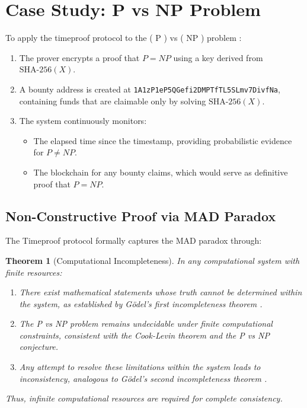 \documentclass[12pt]{report}
\newtheorem{theorem}{Theorem}
\begin{document}
\section{Case Study: P vs NP Problem}

To apply the timeproof protocol to the ( P ) vs ( NP ) problem \cite{Cook1971,Karp1972}:

\begin{enumerate}
    \item The prover encrypts a proof that \( P = NP \) using a key derived from \( \text{SHA-256}(X) \).
    \item A bounty address is created at \texttt{1A1zP1eP5QGefi2DMPTfTL5SLmv7DivfNa}, containing funds that are claimable only by solving \( \text{SHA-256}(X) \).
    \item The system continuously monitors:
    \begin{itemize}
        \item The elapsed time since the timestamp, providing probabilistic evidence for \( P \neq NP \).
        \item The blockchain for any bounty claims, which would serve as definitive proof that \( P = NP \).
    \end{itemize}
\end{enumerate}

\subsection{Non-Constructive Proof via MAD Paradox}
The Timeproof protocol formally captures the MAD paradox through:

\begin{theorem}[Computational Incompleteness]
In any computational system with finite resources:
\begin{enumerate}
    \item There exist mathematical statements whose truth cannot be determined within the system, as established by Gödel's first incompleteness theorem \cite{Godel1931}.
    \item The P vs NP problem remains undecidable under finite computational constraints, consistent with the Cook-Levin theorem \cite{Cook1971} and the P vs NP conjecture.
    \item Any attempt to resolve these limitations within the system leads to inconsistency, analogous to Gödel's second incompleteness theorem \cite{Godel1931}.
\end{enumerate}
Thus, infinite computational resources are required for complete consistency.
\end{theorem}
\end{document}
